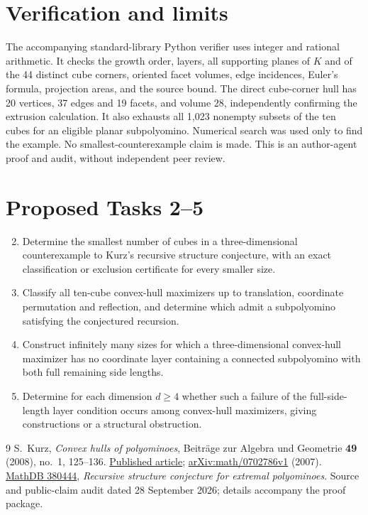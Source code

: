 \documentclass[11pt]{article}
\begin{document}
\section*{Verification and limits}
The accompanying standard-library Python verifier uses integer and
rational arithmetic. It checks the growth order, layers, all supporting
planes of $K$ and of the 44 distinct cube corners, oriented facet
volumes, edge incidences, Euler's formula, projection areas, and the
source bound. The direct cube-corner hull has 20 vertices, 37 edges and
19 facets, and volume $28$, independently confirming the extrusion
calculation. It also exhausts all 1,023 nonempty subsets of the ten cubes
for an eligible planar subpolyomino. Numerical search was used only to
find the example. No smallest-counterexample claim is made. This is an
author-agent proof and audit, without independent peer review.

\section*{Proposed Tasks 2--5}
\begin{enumerate}
\setcounter{enumi}{1}
\item Determine the smallest number of cubes in a three-dimensional
counterexample to Kurz's recursive structure conjecture, with an exact
classification or exclusion certificate for every smaller size.
\item Classify all ten-cube convex-hull maximizers up to translation,
coordinate permutation and reflection, and determine which admit a
subpolyomino satisfying the conjectured recursion.
\item Construct infinitely many sizes for which a three-dimensional
convex-hull maximizer has no coordinate layer containing a connected
subpolyomino with both full remaining side lengths.
\item Determine for each dimension $d\ge4$ whether such a failure of the
full-side-length layer condition occurs among convex-hull maximizers,
giving constructions or a structural obstruction.
\end{enumerate}

\begin{thebibliography}{9}
 S.~Kurz, \emph{Convex hulls of polyominoes},
Beitr\"age zur Algebra und Geometrie \textbf{49} (2008), no.~1, 125--136.
\href{https://www.maths.tcd.ie/EMIS/journals/BAG/vol.49/no.1/b49h1kur.pdf}{Published article};
\href{https://arxiv.org/abs/math/0702786}{arXiv:math/0702786v1} (2007).
 \href{https://mathdb.com/p/380444}{MathDB 380444},
\emph{Recursive structure conjecture for extremal polyominoes}.
Source and public-claim audit dated 28 September 2026; details accompany
the proof package.
\end{thebibliography}
\end{document}
